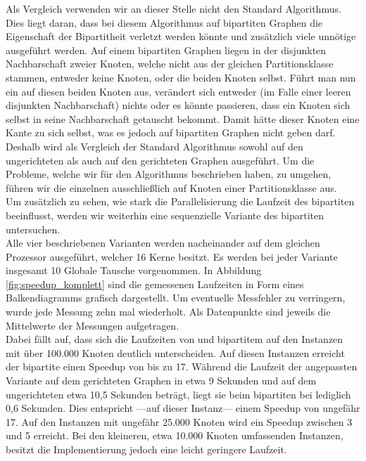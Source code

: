 Als Vergleich verwenden wir an dieser Stelle nicht 
den Standard \gc{} Algorithmus. Dies liegt daran, 
dass bei diesem Algorithmus auf bipartiten Graphen die Eigenschaft der
Bipartitheit verletzt werden könnte und zusätzlich viele unnötige  ausgeführt werden. 
Auf einem bipartiten Graphen liegen in der disjunkten Nachbarschaft zweier Knoten, 
welche nicht aus der gleichen Partitionsklasse stammen, entweder keine Knoten,
 oder die beiden Knoten selbst. 
Führt man nun ein \ct{} auf diesen beiden Knoten aus, verändert sich entweder (im Falle einer leeren disjunkten
Nachbarschaft) nichts
oder es könnte passieren, dass ein Knoten sich selbst in seine Nachbarschaft getauscht bekommt.
Damit hätte dieser Knoten eine Kante zu sich selbst, was es jedoch auf bipartiten Graphen nicht 
geben darf.
\\

Deshalb wird als Vergleich der Standard \cb{} Algorithmus \cite{DBLP:conf/esa/CarstensH0PTW18}
sowohl auf den ungerichteten als auch auf den gerichteten Graphen ausgeführt.
Um die Probleme, welche wir für den \gc{} Algorithmus beschrieben haben, zu umgehen, 
führen wir die einzelnen  ausschließlich auf Knoten einer Partitionsklasse aus.
\\

Um zusätzlich zu sehen, wie stark die Parallelisierung die Laufzeit des bipartiten
\gc{} beeinflusst, werden wir weiterhin eine sequenzielle Variante des bipartiten \gc{} 
untersuchen.
\\

Alle vier beschriebenen Varianten werden nacheinander auf dem gleichen Prozessor ausgeführt, welcher 16
Kerne besitzt. Es werden bei jeder Variante insgesamt 10 Globale Tausche vorgenommen.
In Abbildung \ref{fig:speedup_komplett} sind die gemessenen Laufzeiten in Form
eines Balkendiagramms grafisch dargestellt.
Um eventuelle Messfehler zu verringern, wurde jede Messung zehn mal 
wiederholt. Als Datenpunkte sind jeweils die Mittelwerte der Messungen aufgetragen.
\\

Dabei fällt auf, dass sich die Laufzeiten von \cb{} und bipartitem \gc{} auf den
Instanzen mit über 100.000 Knoten deutlich unterscheiden. Auf diesen Instanzen erreicht
der bipartite \gc{} einen Speedup von bis zu 17. 
Während die Laufzeit der angepassten \cb{} Variante auf dem gerichteten Graphen in etwa 9 Sekunden
und auf dem ungerichteten etwa 10,5 Sekunden beträgt, liegt sie beim bipartiten \gc{} bei lediglich 
0,6 Sekunden. Dies entspricht ---auf dieser Instanz---  einem Speedup von ungefähr 17.
Auf den Instanzen mit ungefähr 25.000 Knoten wird ein Speedup zwischen 3 und 5 erreicht.
Bei den kleineren, etwa 10.000 Knoten umfassenden Instanzen, besitzt die \cb{} Implementierung jedoch 
eine leicht geringere Laufzeit.
\\

